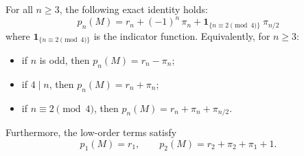 \begin{theorem}\label{thm:real-input-40-prime-artin-splitting}
For all \(n\ge 3\), the following exact identity holds:
\[
\boxed{\;
p_n(M)=r_n+(-1)^n\,\pi_n+\mathbf{1}_{\{n\equiv 2\!\!\pmod 4\}}\ \pi_{n/2}\;}
\]
where \(\mathbf{1}_{\{n\equiv 2\!\!\pmod 4\}}\) is the indicator function.
Equivalently, for \(n\ge 3\):
\begin{itemize}
  \item if \(n\) is odd, then \(p_n(M)=r_n-\pi_n\);
  \item if \(4\mid n\), then \(p_n(M)=r_n+\pi_n\);
  \item if \(n\equiv 2\pmod 4\), then \(p_n(M)=r_n+\pi_n+\pi_{n/2}\).
\end{itemize}
Furthermore, the low-order terms satisfy
\[
p_1(M)=r_1,
\qquad
p_2(M)=r_2+\pi_2+\pi_1+1.
\]
\end{theorem}

